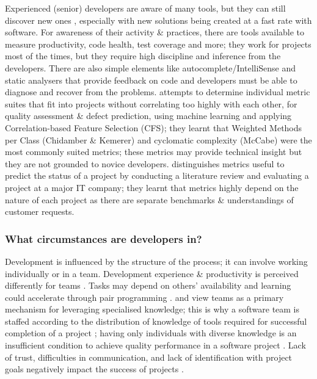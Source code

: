 \documentclass[../mpaper.tex]{subfiles}
\begin{document}
Experienced (senior) developers are aware of many tools, but they can still discover new ones \cite{murphy-hillHowUsersDiscover2015}, especially with new solutions being created at a fast rate with software. For awareness of their activity \& practices, there are tools available to measure productivity, code health, test coverage and more; they work for projects most of the times, but they require high discipline and inference from the developers. There are also simple elements like autocomplete/IntelliSense and static analysers that provide feedback on code and developers must be able to diagnose and recover from the problems. \citet{lajiosSoftwareMetricsSuites2009} attempts to determine individual metric suites that fit into projects without correlating too highly with each other, for quality assessment \& defect prediction, using machine learning and applying Correlation-based Feature Selection (CFS); they learnt that Weighted Methods per Class (Chidamber \& Kemerer) and cyclomatic complexity (McCabe) were the most commonly suited metrics; these metrics may provide technical insight but they are not grounded to novice developers. \citet{blondeauSoftwareMetricsPredict2015} distinguishes metrics useful to predict the status of a project by conducting a literature review and evaluating a project at a major IT company; they learnt that metrics highly depend on the nature of each project as there are separate benchmarks \& understandings of customer requests.

\subsubsection*{What circumstances are developers in?}

Development is influenced by the structure of the process; it can involve working individually or in a team. Development experience \& productivity is perceived differently for teams \cite{ruvimovaExploratoryStudyProductivity2022}. Tasks may depend on others' availability and learning could accelerate through pair programming \cite{murphy-hillHowUsersDiscover2015}. \citet{cookeMeasuringTeamKnowledge2001} and \citet{lewisMeasuringTransactiveMemory2003} view teams as a primary mechanism for leveraging specialised knowledge; this is why a software team is staffed according to the distribution of knowledge of tools required for successful completion of a project \cite{walzSoftwareDesignTeam1993}; having only individuals with diverse knowledge is an insufficient condition to achieve quality performance in a software project \cite{farajCoordinatingExpertiseSoftware2000}. Lack of trust, difficulties in communication, and lack
of identification with project goals negatively impact the
success of projects \cite{smiteEmpiricalEvidenceGlobal2010}.
\end{document}
